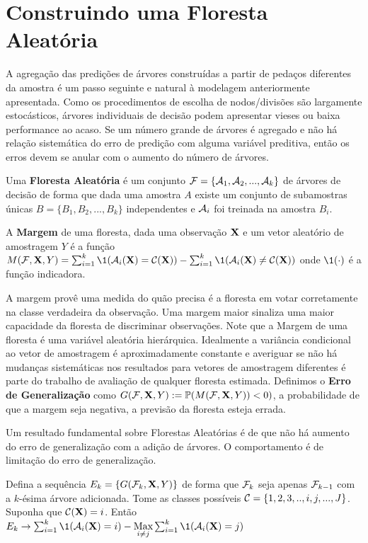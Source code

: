  \section{Construindo uma Floresta Aleatória}
 
 A agregação das predições de árvores construídas a partir de pedaços diferentes da amostra é um passo seguinte e natural à modelagem anteriormente apresentada. Como os procedimentos de escolha de nodos/divisões são largamente estocásticos, árvores individuais de decisão podem apresentar vieses ou baixa performance ao acaso. Se um número grande de árvores é agregado e não há relação sistemática do erro de predição com alguma variável preditiva, então os erros devem se anular com o aumento do número de árvores.
 
 \begin{defi}
 Uma \textbf{Floresta Aleatória} é um conjunto $\mathcal{F} = \{\mathcal{A}_1, \mathcal{A}_2,...,\mathcal{A}_k\}$ de árvores de decisão de forma que dada uma amostra $A$ existe um conjunto de subamostras únicas $B = \{ B_1, B_2, ..., B_k\}$ independentes e $\mathcal{A}_i$ foi treinada na amostra $B_i$.
  \end{defi}
  
  \begin{defi}
  A \textbf{Margem} de uma floresta, dada uma observação $\mathbf{X}$ e um vetor aleatório de amostragem $Y$ é a função $M(\F, \X, Y)= \sum_{i=1}^k \1 ( \A_i (\X) = \C(\X) ) - \sum_{i=1}^k \1  ( \A_i (\X) \neq \C(\X) )  $ onde $\1(\cdot)$ é a função indicadora.
  \end{defi}
  
  A margem provê uma medida do quão precisa é a floresta em votar corretamente na classe verdadeira da observação. Uma margem maior sinaliza uma maior capacidade da floresta de discriminar observações. Note que a Margem de uma floresta é uma variável aleatória hierárquica. Idealmente a variância condicional ao vetor de amostragem é aproximadamente constante e averiguar se não há mudanças sistemáticas nos resultados para vetores de amostragem diferentes é parte do trabalho de avaliação de qualquer floresta estimada. Definimos o \textbf{Erro de Generalização} como $G(\mathcal{F}, \mathbf{X}, Y) := \mathbb{P} (M(\mathcal{F}, \mathbf{X}, Y)) < 0)$, a probabilidade de que a margem seja negativa, a previsão da floresta esteja errada. 
 
 Um resultado fundamental sobre Florestas Aleatórias é de que não há aumento do erro de generalização com a adição de árvores. O comportamento é de limitação do erro de generalização.
 
 \begin{teo}
 Defina a sequência $E_k = \{ G(\mathcal{F}_k, \mathbf{X}, Y) \}$ de forma que $\mathcal{F}_k$ seja apenas $\mathcal{F}_{k-1}$ com a $k$-ésima árvore adicionada. Tome as classes possíveis $\mathcal{C} = \{1,2,3,..,i,j,...,J \}$. Suponha que $\mathcal{C}(\mathbf{X}) = i$. Então $E_k \to \sum_{i=1}^k \1 ( \A_i (\X) = i ) - \underset{i \neq j}{\text{Max}} \sum_{i=1}^k \1  ( \A_i (\X) = j ) $
 
 \end{teo}
 
